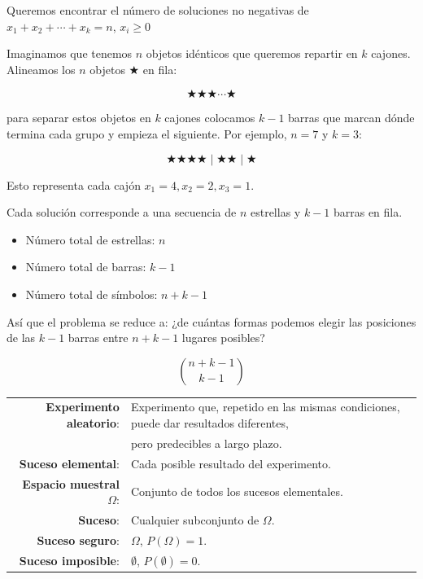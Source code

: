 \documentclass[10pt,a4paper]{article}
\begin{document}
\begin{tcolorbox}[title=Problema de las estrellas y barras]
Queremos encontrar el número de soluciones no negativas de $x_1 + x_2 + \cdots + x_k = n$, $x_i \geq 0$

Imaginamos que tenemos $n$ objetos idénticos que queremos repartir en $k$ cajones. Alineamos los $n$ objetos $\bigstar$ en fila:

\[
\bigstar \bigstar \bigstar \cdots \bigstar
\]

para separar estos objetos en $k$ cajones colocamos $k-1$ barras que marcan dónde termina cada grupo y empieza el siguiente.
Por ejemplo, $n = 7$ y $k = 3$:

\[
\bigstar \bigstar \bigstar \bigstar \mid \bigstar \bigstar \mid \bigstar
\]

Esto representa cada cajón $x_1 = 4, x_2 = 2, x_3 = 1$.

Cada solución corresponde a una secuencia de $n$ estrellas y $k-1$ barras en fila.

\begin{itemize}
    \item Número total de estrellas: $n$
    \item Número total de barras: $k-1$
    \item Número total de símbolos: $n + k - 1$
\end{itemize}

Así que el problema se reduce a: ¿de cuántas formas podemos elegir las posiciones de las $k-1$ barras entre $n+k-1$ lugares posibles?

\[
\binom{n+k-1}{k-1}
\]

\end{tcolorbox}


\begin{tcolorbox}[title=Definiciones, equal height group=SUC1]
    \begin{tabular}{rl}
        \textbf{Experimento aleatorio}: & Experimento que, repetido en las mismas condiciones, puede dar resultados diferentes, \\
                                        & pero predecibles a largo plazo. \\
        \textbf{Suceso elemental}: & Cada posible resultado del experimento. \\
        \textbf{Espacio muestral \(\Omega\)}: & Conjunto de todos los sucesos elementales. \\
        \textbf{Suceso}: & Cualquier subconjunto de \(\Omega\). \\
        \textbf{Suceso seguro}: & \(\Omega\), \(P(\Omega) = 1\). \\
        \textbf{Suceso imposible}: & \(\emptyset\), \(P(\emptyset) = 0\).
    \end{tabular}
\end{tcolorbox}
\end{document}
